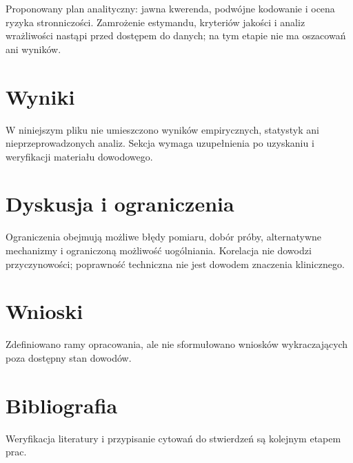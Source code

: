 \documentclass[11pt,a4paper]{article}
\begin{document}
Proponowany plan analityczny: jawna kwerenda, podwójne kodowanie i ocena ryzyka stronniczości. Zamrożenie estymandu, kryteriów jakości i analiz wrażliwości nastąpi przed dostępem do danych; na tym etapie nie ma oszacowań ani wyników.

\section{Wyniki}

W niniejszym pliku nie umieszczono wyników empirycznych, statystyk ani nieprzeprowadzonych analiz. Sekcja wymaga uzupełnienia po uzyskaniu i weryfikacji materiału dowodowego.

\section{Dyskusja i ograniczenia}

Ograniczenia obejmują możliwe błędy pomiaru, dobór próby, alternatywne mechanizmy i ograniczoną możliwość uogólniania. Korelacja nie dowodzi przyczynowości; poprawność techniczna nie jest dowodem znaczenia klinicznego.

\section{Wnioski}

Zdefiniowano ramy opracowania, ale nie sformułowano wniosków wykraczających poza dostępny stan dowodów.

\section*{Bibliografia}

Weryfikacja literatury i przypisanie cytowań do stwierdzeń są kolejnym etapem prac.
\end{document}
